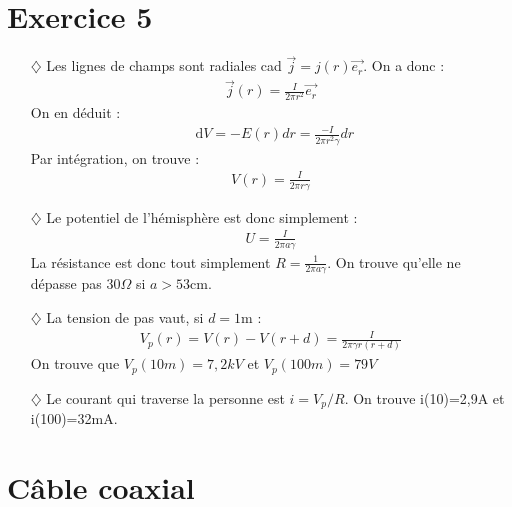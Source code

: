 \documentclass{report}
\newcommand*\dif{\mathop{}\!\mathrm{d}}
\begin{document}
\section*{Exercice 5}

\begin{itemize}

	\item[$\diamondsuit$] Les lignes de champs sont radiales cad $\vec{j}=j(r)\vec{e_r}$. On a donc :
\begin{align*}
	\vec{j}(r)=\frac{I}{2\pi r^2}\vec{e_r}
\end{align*}
On en déduit :
\begin{align*}
	\dif V=-E(r)dr=\frac{-I}{2\pi r^2\gamma}dr
\end{align*}
Par intégration, on trouve :
\begin{align*}
	V(r)=\frac{I}{2\pi r\gamma}
\end{align*}

	\item[$\diamondsuit$] Le potentiel de l'hémisphère est donc simplement :
\begin{align*}
	U=\frac{I}{2\pi a\gamma}
\end{align*}
La résistance est donc tout simplement $R=\frac{1}{2\pi a \gamma}$. On trouve qu'elle ne dépasse pas 30$\Omega$ si $a>53$cm.

	\item[$\diamondsuit$] La tension de pas vaut, si $d=1$m :
	\begin{align*}
		V_p(r)=V(r)-V(r+d)=\frac{I}{2\pi \gamma r(r+d)}
	\end{align*}
On trouve que $V_p(10m)=7,2kV$ et  $V_p(100m)=79V$

	\item[$\diamondsuit$] Le courant qui traverse la personne est $i=V_p/R$. On trouve i(10)=2,9A et i(100)=32mA.
\end{itemize}

\section*{Câble coaxial}
\end{document}
